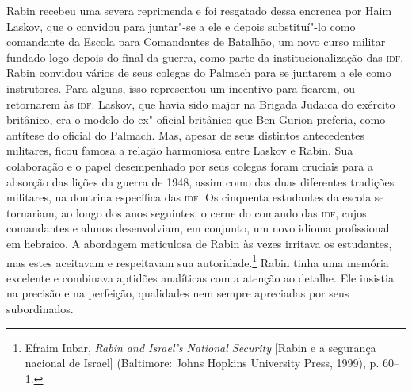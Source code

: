 Rabin recebeu uma severa reprimenda e foi resgatado dessa encrenca por
Haim Laskov, que o convidou para juntar"-se a ele e depois substituí"-lo
como comandante da Escola para Comandantes de Batalhão, um novo curso
militar fundado logo depois do final da guerra, como parte da
institucionalização das \textsc{idf}. Rabin convidou vários de seus colegas do
Palmach para se juntarem a ele como instrutores. Para alguns, isso representou
um incentivo para ficarem, ou retornarem às \textsc{idf}. Laskov, que havia sido
major na Brigada Judaica do exército britânico, era o modelo do
ex"-oficial britânico que Ben Gurion preferia, como antítese do oficial
do Palmach. Mas, apesar de seus distintos antecedentes militares, ficou
famosa a relação harmoniosa entre Laskov e Rabin. Sua colaboração e o
papel desempenhado por seus colegas foram cruciais para a absorção das
lições da guerra de 1948, assim como das duas diferentes tradições
militares, na doutrina específica das \textsc{idf}. Os cinquenta estudantes da
escola se tornariam, ao longo dos anos seguintes, o cerne do comando das
\textsc{idf}, cujos comandantes e alunos desenvolviam, em conjunto, um novo idioma
profissional em hebraico. A abordagem meticulosa de Rabin às vezes
irritava os estudantes, mas estes aceitavam e respeitavam sua
autoridade.\footnote{Efraim Inbar, \textit{Rabin and Israel's National Security} {[Rabin e a segurança nacional de Israel]} (Baltimore: Johns
Hopkins University Press, 1999), p. 60--1.} Rabin tinha uma memória excelente e combinava
aptidões analíticas com a atenção ao detalhe. Ele insistia na precisão e
na perfeição, qualidades nem sempre apreciadas por seus subordinados.

